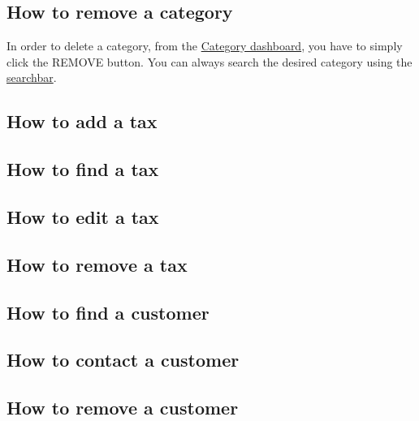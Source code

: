 \subsection{How to remove a category}\label{_removeCategory}
In order to delete a category, from the \hyperref[_categorymanagement]{Category dashboard}, you have to simply click the REMOVE button.
You can always search the desired category using the \hyperref[_findCategory]{searchbar}.

\subsection{How to add a tax}\label{_addTax}
\subsection{How to find a tax}\label{_findTax}
\subsection{How to edit a tax}\label{_editTax}
\subsection{How to remove a tax}\label{_removeTax}
\subsection{How to find a customer}\label{_findCustomer}
\subsection{How to contact a customer}\label{_contactCustomer}
\subsection{How to remove a customer}\label{_removeCustomer}